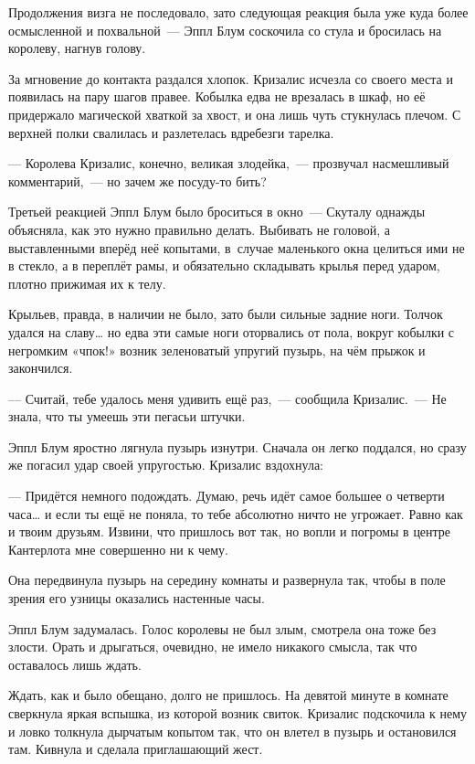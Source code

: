 \documentclass[fontsize=11pt,a5paper,titlepage=firstcover]{scrbook}
\begin{document}
Продолжения визга не последовало, зато следующая реакция была уже куда более осмысленной и похвальной~--- Эппл Блум соскочила со стула и бросилась на королеву, нагнув голову.

За мгновение до контакта раздался хлопок. Кризалис исчезла со своего места и появилась на пару шагов правее. Кобылка едва не врезалась в шкаф, но её придержало магической хваткой за хвост, и она лишь чуть стукнулась плечом. С верхней полки свалилась и разлетелась вдребезги тарелка.

--- Королева Кризалис, конечно, великая злодейка,~--- прозвучал насмешливый комментарий,~--- но зачем же посуду-то бить?

Третьей реакцией Эппл Блум было броситься в окно~--- Скуталу однажды объясняла, как это нужно правильно делать. Выбивать не головой, а выставленными вперёд неё копытами, в~случае маленького окна целиться ими не в стекло, а в переплёт рамы, и обязательно складывать крылья перед ударом, плотно прижимая их к телу.

Крыльев, правда, в наличии не было, зато были сильные задние ноги. Толчок удался на славу{\ldots} но едва эти самые ноги оторвались от пола, вокруг кобылки с негромким «чпок!» возник зеленоватый упругий пузырь, на чём прыжок и закончился.

--- Считай, тебе удалось меня удивить ещё раз,~--- сообщила Кризалис.~--- Не знала, что ты умеешь эти пегасьи штучки.

Эппл Блум яростно лягнула пузырь изнутри. Сначала он легко поддался, но сразу же погасил удар своей упругостью. Кризалис вздохнула:

--- Придётся немного подождать. Думаю, речь идёт самое большее о четверти часа{\ldots} и если ты ещё не поняла, то тебе абсолютно ничто не угрожает. Равно как и твоим друзьям. Извини, что пришлось вот так, но вопли и погромы в центре Кантерлота мне совершенно ни к чему.

Она передвинула пузырь на середину комнаты и развернула так, чтобы в поле зрения его узницы оказались настенные часы.

Эппл Блум задумалась. Голос королевы не был злым, смотрела она тоже без злости. Орать и дрыгаться, очевидно, не имело никакого смысла, так что оставалось лишь ждать.

Ждать, как и было обещано, долго не пришлось. На девятой минуте в комнате сверкнула яркая вспышка, из которой возник свиток. Кризалис подскочила к нему и ловко толкнула дырчатым копытом так, что он влетел в пузырь и остановился там. Кивнула и сделала приглашающий жест.
\end{document}
